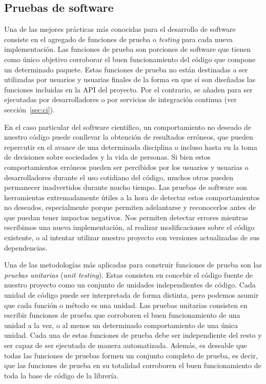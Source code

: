 \subsection{Pruebas de software}

Una de las mejores prácticas más conocidas para el desarrollo de software
consiste en el agregado de funciones de prueba o \emph{testing} para cada nueva
implementación.
Las funciones de prueba son porciones de software que tienen como único
objetivo corroborar el buen funcionamiento del código que compone un
determinado paquete.
Estas funciones de prueba no están destinadas a ser utilizadas por usuarios
y usuarias finales de la forma en que sí son diseñadas las funciones incluidas
en la \ac{API} del proyecto.
Por el contrario, se añaden para ser ejecutadas por desarrolladores o por
servicios de integración continua (ver sección~\ref{sec:ci}).

En el caso particular del software científico, un comportamiento no deseado de
nuestro código puede conllevar la obtención de resultados erróneos, que pueden
repercutir en el avance de una determinada disciplina o incluso hasta en la
toma de decisiones sobre sociedades y la vida de personas.
Si bien estos comportamientos erróneos pueden ser percibidos por los usuarios
y usuarias o desarrolladores durante el uso cotidiano del código, muchos otros
pueden permanecer inadvertidos durante mucho tiempo.
Las pruebas de software son herramientas extremadamente útiles a la hora de
detectar estos comportamientos no deseados, especialmente porque permiten
adelantarse y reconocerlos antes de que puedan tener impactos negativos.
Nos permiten detectar errores mientras escribimos una nueva implementación, al
realizar modificaciones sobre el código existente, o al intentar utilizar
nuestro proyecto con versiones actualizadas de sus dependencias.

Una de las metodologías más aplicadas para construir funciones de prueba son
las \emph{pruebas unitarias} (\emph{unit testing}).
Estas consisten en concebir el código fuente de nuestro proyecto como un
conjunto de unidades independientes de código.
Cada unidad de código puede ser interpretada de forma distinta, pero podemos
asumir que cada función o método es una unidad.
Las pruebas unitarias consisten en escribir funciones de prueba que corroboren
el buen funcionamiento de una unidad a la vez, o al menos un determinado
comportamiento de una única unidad.
Cada una de estas funciones de prueba debe ser independiente del resto y ser
capaz de ser ejecutada de manera automatizada.
Además, es deseable que todas las funciones de pruebas formen un conjunto
completo de prueba, es decir, que las funciones de prueba en su totalidad
corroboren el buen funcionamiento de toda la base de código de la librería.

